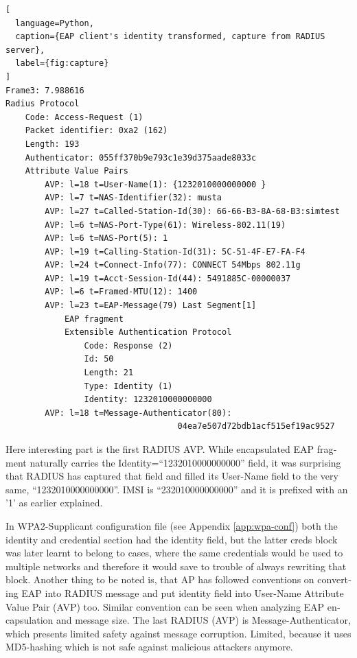 \documentclass[12pt,a4paper,english]{tutthesis}
\begin{document}
\begin{otherlanguage}{english}
\renewcommand{\lstlistingname}{Capture}
\begin{lstlisting}[
  language=Python,
  caption={EAP client's identity transformed, capture from RADIUS server},
  label={fig:capture}
]
Frame3: 7.988616
Radius Protocol
    Code: Access-Request (1)
    Packet identifier: 0xa2 (162)
    Length: 193
    Authenticator: 055ff370b9e793c1e39d375aade8033c
    Attribute Value Pairs
        AVP: l=18 t=User-Name(1): {1232010000000000 }
        AVP: l=7 t=NAS-Identifier(32): musta
        AVP: l=27 t=Called-Station-Id(30): 66-66-B3-8A-68-B3:simtest
        AVP: l=6 t=NAS-Port-Type(61): Wireless-802.11(19)
        AVP: l=6 t=NAS-Port(5): 1
        AVP: l=19 t=Calling-Station-Id(31): 5C-51-4F-E7-FA-F4
        AVP: l=24 t=Connect-Info(77): CONNECT 54Mbps 802.11g
        AVP: l=19 t=Acct-Session-Id(44): 5491885C-00000037
        AVP: l=6 t=Framed-MTU(12): 1400
        AVP: l=23 t=EAP-Message(79) Last Segment[1]
            EAP fragment
            Extensible Authentication Protocol
                Code: Response (2)
                Id: 50
                Length: 21
                Type: Identity (1)
                Identity: 1232010000000000
        AVP: l=18 t=Message-Authenticator(80):
                                   04ea7e507d72bdb1acf515ef19ac9527
\end{lstlisting}
\normalsize


Here interesting part is the first RADIUS AVP.
While encapsulated EAP fragment naturally carries the Identity=``1232010000000000''
field, it was surprising that RADIUS has captured that field and 
filled its User-Name field to the very same, ``1232010000000000''. 
IMSI is ``232010000000000'' and it is prefixed with
an '1' as earlier explained.

In WPA2-Supplicant configuration file (see Appendix \ref{app:wpa-conf}) both the identity and
credential section had the identity field, but the latter creds block
was later learnt to belong to cases, where the same credentials would
be used to multiple networks and therefore it would save to trouble of
always rewriting that block.
Another thing to be noted is, that AP has followed conventions on
converting EAP into RADIUS message and put identity field into
User-Name Attribute Value Pair (AVP) too.
Similar convention can be seen when analyzing EAP encapsulation and
message size. The last RADIUS (AVP) is 
Message-Authenticator, which presents limited safety against message 
corruption. Limited, because it uses MD5-hashing which is not safe
against malicious attackers anymore.




\end{otherlanguage}
\end{document}

